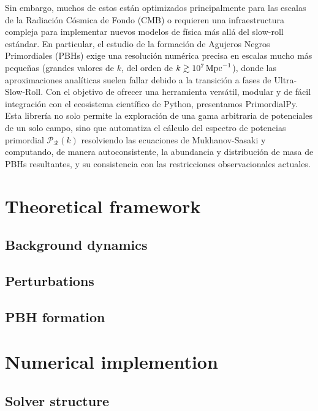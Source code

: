 \documentclass{SciPost}
\begin{document}
Sin embargo, muchos de estos están optimizados principalmente para las escalas de la Radiación Cósmica de Fondo (CMB) o requieren una infraestructura compleja para implementar nuevos modelos de física más allá del slow-roll estándar. En particular, el estudio de la formación de Agujeros Negros Primordiales (PBHs) exige una resolución numérica precisa en escalas mucho más pequeñas (grandes valores de $k$, del orden de $k\gtrsim 10^{7}\,{\rm Mpc}^{-1}$), donde las aproximaciones analíticas suelen fallar debido a la transición a fases de Ultra-Slow-Roll. Con el objetivo de ofrecer una herramienta versátil, modular y de fácil integración con el ecosistema científico de Python, presentamos PrimordialPy. Esta librería no solo permite la exploración de una gama arbitraria de potenciales de un solo campo, sino que automatiza el cálculo del espectro de potencias primordial $\mathcal{P}_\mathcal{R}(k)$ resolviendo las ecuaciones de Mukhanov-Sasaki y computando, de manera autoconsistente, la abundancia y distribución de masa de PBHs resultantes, y su consistencia con las restricciones observacionales actuales.








\section{Theoretical framework}
\label{sec2}

    \subsection{Background dynamics}
    \subsection{Perturbations}
    \subsection{PBH formation}


\section{Numerical implemention}
\label{sec3}

    \subsection{Solver structure}
\end{document}
